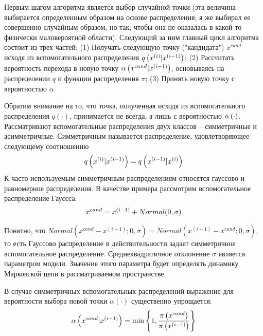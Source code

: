 Первым шагом алгоритма является выбор случайной точки (эта величина выбирается определенным образом на основе распределения; я же выбирал ее совершенно случайным образом, но так, чтобы она не оказалась в какой-то физически маловероятной области). Следующий за ним главный цикл алгоритма состоит из трех частей: (1) Получать следующую точку ("кандидата") $x^{cand}$ исходя из вспомогательного распределения $q \left( x^{(i)} | x^{(i-1)} \right)$; (2) Рассчитать вероятность перехода в новую точку $\alpha \left( x^{cand} | x^{(i-1)} \right)$, основываясь на распределении $q$ и функции распределения $\pi$; (3) Принять новую точку с вероятностью $\alpha$. \par
Обратим внимание на то, что точка, полученная исходя из вспомогательного распределения $q(\cdot)$, принимается не всегда, а лишь с вероятностью $\alpha \left( \cdot \right)$. Рассматривают вспомогательные распределения двух классов -- симметричные и асимметричные. Симметричным называется распределение, удовлетворяющее следующему соотношению
\begin{gather}
		q \left( x^{(i)} | x^{(i-1)} \right) = q \left( x^{(i-1)} | x^{(i)} \right) \notag
\end{gather}
К часто используемым симметричным распределениям относятся гауссово и равномерное распределения. В качестве примера рассмотрим вспомогательное распределение Гауссса: 
\begin{gather}
		x^{cand} = x^{(i-1)} + Normal(0, \sigma) \notag
\end{gather}

Понятно, что $Normal( x^{cand} - x^{(i-1)}; 0, \sigma ) = Normal( x^{(i-1)} - x^{cand}; 0, \sigma)$, то есть Гауссово распределение в действительности задает симметричное вспомогательное распределение. Среднеквадратичное отклонение $\sigma$ является параметром модели. Значение этого параметра будет определять динамику Марковской цепи в рассматриваемом пространстве. \par
В случае симметричных вспомогательных распределений выражение для вероятности выбора новой точки $\alpha(\cdot)$ существенно упрощается:
\begin{gather}
		\alpha \left( x^{cand} | x^{(i-1)} \right) = \min \left\{ 1, \frac{\pi \left( x^{cand} \right)}{\pi \left( x^{(i - 1)} \right)} \right\} \notag 
\end{gather}

